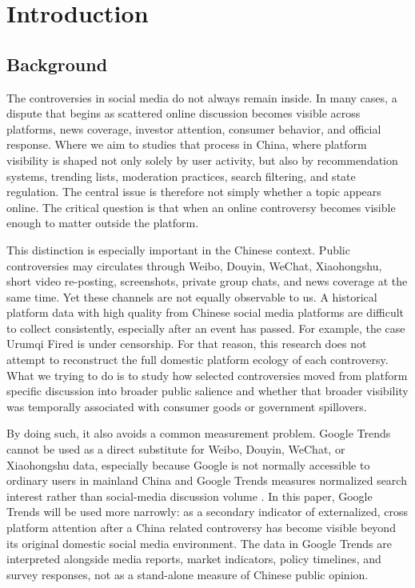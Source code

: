 \documentclass[conference]{IEEEtran}
\begin{document}
\section{Introduction}
\subsection{Background}
The controversies in social media do not always remain inside. In many cases, a dispute that begins as scattered online discussion becomes visible across platforms, news coverage, investor attention, consumer behavior, and official response. Where we aim to studies that process in China, where platform visibility is shaped not only solely by user activity, but also by recommendation systems, trending lists, moderation practices, search filtering, and state regulation. The central issue is therefore not simply whether a topic appears online. The critical question is that when an online controversy becomes visible enough to matter outside the platform.

This distinction is especially important in the Chinese context. Public controversies may circulates through Weibo, Douyin, WeChat, Xiaohongshu, short video re-posting, screenshots, private group chats, and news coverage at the same time. Yet these channels are not equally observable to us. A historical platform data with high quality from Chinese social media platforms are difficult to collect consistently, especially after an event has passed. For example, the case Urumqi Fired is under censorship. For that reason, this research does not attempt to reconstruct the full domestic platform ecology of each controversy. What we trying to do is to study how selected controversies moved from platform specific discussion into broader public salience and whether that broader visibility was temporally associated with consumer goods or government spillovers.

By doing such, it also avoids a common measurement problem. Google Trends cannot be used as a direct substitute for Weibo, Douyin, WeChat, or Xiaohongshu data, especially because Google is not normally accessible to ordinary users in mainland China and Google Trends measures normalized search interest rather than social-media discussion volume \cite{googlechina2010,googlechina2012,googletrendsfaq}. In this paper, Google Trends will be used more narrowly: as a secondary indicator of externalized, cross platform attention after a China related controversy has become visible beyond its original domestic social media environment. The data in Google Trends are interpreted alongside media reports, market indicators, policy timelines, and survey responses, not as a stand-alone measure of Chinese public opinion.
\end{document}
